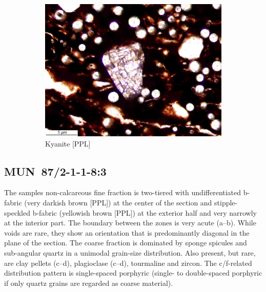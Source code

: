 \documentclass[a4paper]{article}
\begin{document}
\begin{figure}[H]
\begin{subfigure}[t]{.32\textwidth}
		\includegraphics[width=\textwidth]{ThinSections/106-3_40x_PPL.jpg}
		\caption{Kyanite [PPL]}
	\end{subfigure}
	\caption{}
	\label{fig:106_mun}
\end{figure}

\newpage\subsection{MUN~87/2-1-1-8:3 \citep[mun\#107; Fig.~\ref{fig:mun.pottery}.4; Pikunda-Munda style;][472 Pl.~91.7]{Seidensticker.2021e}}

\begin{multicols}{2}
\noindent The samples non-calcareous fine fraction is two-tiered with undifferentiated b-fabric (very darkish brown [PPL]) at the center of the section and stipple-speckled b-fabric (yellowish brown [PPL]) at the exterior half and very narrowly at the interior part. The boundary between the zones is very acute (a--b). While voids are rare, they show an orientation that is predominantly diagonal in the plane of the section. The coarse fraction is dominated by sponge spicules and sub-angular quartz in a unimodal grain-size distribution. Also present, but rare, are clay pellets (c--d), plagioclase (c--d), tourmaline and zircon. The c/f-related distribution pattern is single-spaced porphyric (single- to double-spaced porphyric if only quartz grains are regarded as coarse material).
\end{multicols}
\end{document}
